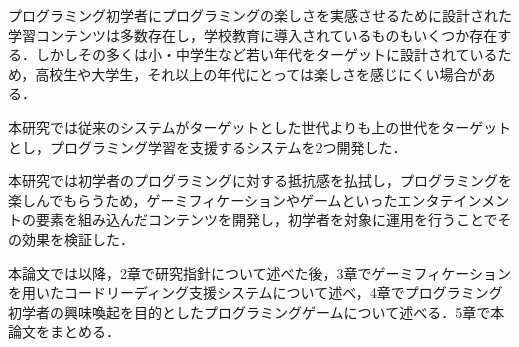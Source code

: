 プログラミング初学者にプログラミングの楽しさを実感させるために設計された学習コンテンツは多数存在し，学校教育に導入されているものもいくつか存在する．しかしその多くは小・中学生など若い年代をターゲットに設計されているため，高校生や大学生，それ以上の年代にとっては楽しさを感じにくい場合がある．

本研究では従来のシステムがターゲットとした世代よりも上の世代をターゲットとし，プログラミング学習を支援するシステムを2つ開発した．

本研究では初学者のプログラミングに対する抵抗感を払拭し，プログラミングを楽しんでもらうため，ゲーミフィケーションやゲームといったエンタテインメントの要素を組み込んだコンテンツを開発し，初学者を対象に運用を行うことでその効果を検証した．

本論文では以降，2章で研究指針について述べた後，3章でゲーミフィケーションを用いたコードリーディング支援システムについて述べ，4章でプログラミング初学者の興味喚起を目的としたプログラミングゲームについて述べる．5章で本論文をまとめる．